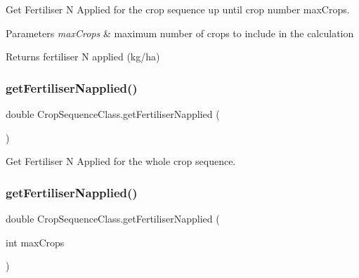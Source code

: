 Get Fertiliser N Applied for the crop sequence up until crop number max\+Crops. 


\begin{DoxyParams}{Parameters}
{\em max\+Crops} & maximum number of crops to include in the calculation \\
\hline
\end{DoxyParams}
\begin{DoxyReturn}{Returns}
fertiliser N applied (kg/ha) 
\end{DoxyReturn}
\mbox{\label{class_crop_sequence_class_af4526f8f9ffcd16aa194f11e0de87e85}} 
\subsubsection{\texorpdfstring{getFertiliserNapplied()}{getFertiliserNapplied()}\hspace{0.1cm}{\footnotesize\ttfamily [1/2]}}
{\footnotesize\ttfamily double Crop\+Sequence\+Class.\+get\+Fertiliser\+Napplied (\begin{DoxyParamCaption}{ }\end{DoxyParamCaption})\hspace{0.3cm}{\ttfamily [inline]}}



Get Fertiliser N Applied for the whole crop sequence. 

\mbox{\label{class_crop_sequence_class_a70461a9368b16ddaed83a1938321a02b}} 
\subsubsection{\texorpdfstring{getFertiliserNapplied()}{getFertiliserNapplied()}\hspace{0.1cm}{\footnotesize\ttfamily [2/2]}}
{\footnotesize\ttfamily double Crop\+Sequence\+Class.\+get\+Fertiliser\+Napplied (\begin{DoxyParamCaption}\item[{int}]{max\+Crops }\end{DoxyParamCaption})\hspace{0.3cm}{\ttfamily [inline]}}



